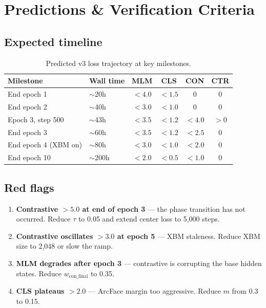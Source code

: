 \documentclass[11pt,a4paper]{article}
\begin{document}
\section{Predictions \& Verification Criteria}

\subsection{Expected timeline}

\begin{table}[H]
\centering
\caption{Predicted v3 loss trajectory at key milestones.}
\begin{tabular}{llcccc}
\toprule
\textbf{Milestone} & \textbf{Wall time} & \textbf{MLM} & \textbf{CLS} & \textbf{CON} & \textbf{CTR} \\
\midrule
End epoch 1 & $\sim$20h & $< 4.0$ & $< 1.5$ & 0 & 0 \\
End epoch 2 & $\sim$40h & $< 3.0$ & $< 1.0$ & 0 & 0 \\
Epoch 3, step 500 & $\sim$43h & $< 3.5$ & $< 1.2$ & $< 4.0$ & $> 0$ \\
End epoch 3 & $\sim$60h & $< 3.5$ & $< 1.2$ & $< 2.5$ & 0 \\
End epoch 4 (XBM on) & $\sim$80h & $< 3.0$ & $< 1.0$ & $< 2.0$ & 0 \\
End epoch 10 & $\sim$200h & $< 2.0$ & $< 0.5$ & $< 1.0$ & 0 \\
\bottomrule
\end{tabular}
\end{table}

\subsection{Red flags}

\begin{enumerate}
\item \textbf{Contrastive $> 5.0$ at end of epoch 3} --- the phase
transition has not occurred. Reduce $\tau$ to 0.05 and extend center
loss to 5{,}000 steps.

\item \textbf{Contrastive oscillates $> 3.0$ at epoch 5} --- XBM staleness.
Reduce XBM size to 2{,}048 or slow the ramp.

\item \textbf{MLM degrades after epoch 3} --- contrastive is corrupting
the base hidden states. Reduce $w_{\text{con\_final}}$ to 0.35.

\item \textbf{CLS plateaus $> 2.0$} --- ArcFace margin too aggressive.
Reduce $m$ from 0.3 to 0.15.
\end{enumerate}
\end{document}
